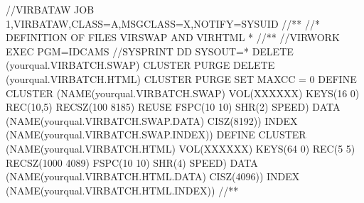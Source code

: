 \documentclass[letterpaper,10pt,english]{sphinxmanual}
\begin{document}
\begin{sphinxVerbatim}[commandchars=\\\{\}]
//VIRBATAW JOB 1,VIRBATAW,CLASS=A,MSGCLASS=X,NOTIFY=\PYGZam{}SYSUID
//*\PYGZhy{}\PYGZhy{}\PYGZhy{}\PYGZhy{}\PYGZhy{}\PYGZhy{}\PYGZhy{}\PYGZhy{}\PYGZhy{}\PYGZhy{}\PYGZhy{}\PYGZhy{}\PYGZhy{}\PYGZhy{}\PYGZhy{}\PYGZhy{}\PYGZhy{}\PYGZhy{}\PYGZhy{}\PYGZhy{}\PYGZhy{}\PYGZhy{}\PYGZhy{}\PYGZhy{}\PYGZhy{}\PYGZhy{}\PYGZhy{}\PYGZhy{}\PYGZhy{}\PYGZhy{}\PYGZhy{}\PYGZhy{}\PYGZhy{}\PYGZhy{}\PYGZhy{}\PYGZhy{}\PYGZhy{}\PYGZhy{}\PYGZhy{}\PYGZhy{}\PYGZhy{}\PYGZhy{}\PYGZhy{}\PYGZhy{}\PYGZhy{}\PYGZhy{}\PYGZhy{}\PYGZhy{}\PYGZhy{}\PYGZhy{}\PYGZhy{}\PYGZhy{}\PYGZhy{}\PYGZhy{}\PYGZhy{}\PYGZhy{}\PYGZhy{}\PYGZhy{}\PYGZhy{}\PYGZhy{}\PYGZhy{}\PYGZhy{}\PYGZhy{}\PYGZhy{}*
//* DEFINITION OF FILES VIRSWAP AND VIRHTML *
//*\PYGZhy{}\PYGZhy{}\PYGZhy{}\PYGZhy{}\PYGZhy{}\PYGZhy{}\PYGZhy{}\PYGZhy{}\PYGZhy{}\PYGZhy{}\PYGZhy{}\PYGZhy{}\PYGZhy{}\PYGZhy{}\PYGZhy{}\PYGZhy{}\PYGZhy{}\PYGZhy{}\PYGZhy{}\PYGZhy{}\PYGZhy{}\PYGZhy{}\PYGZhy{}\PYGZhy{}\PYGZhy{}\PYGZhy{}\PYGZhy{}\PYGZhy{}\PYGZhy{}\PYGZhy{}\PYGZhy{}\PYGZhy{}\PYGZhy{}\PYGZhy{}\PYGZhy{}\PYGZhy{}\PYGZhy{}\PYGZhy{}\PYGZhy{}\PYGZhy{}\PYGZhy{}\PYGZhy{}\PYGZhy{}\PYGZhy{}\PYGZhy{}\PYGZhy{}\PYGZhy{}\PYGZhy{}\PYGZhy{}\PYGZhy{}\PYGZhy{}\PYGZhy{}\PYGZhy{}\PYGZhy{}\PYGZhy{}\PYGZhy{}\PYGZhy{}\PYGZhy{}\PYGZhy{}\PYGZhy{}\PYGZhy{}\PYGZhy{}\PYGZhy{}\PYGZhy{}*
//VIRWORK EXEC PGM=IDCAMS
//SYSPRINT DD SYSOUT=*
    DELETE (yourqual.VIRBATCH.SWAP) CLUSTER PURGE
    DELETE (yourqual.VIRBATCH.HTML) CLUSTER PURGE
    SET MAXCC = 0
    DEFINE CLUSTER (NAME(yourqual.VIRBATCH.SWAP) \PYGZhy{}
        VOL(XXXXXX) KEYS(16 0) REC(10,5) RECSZ(100 8185) \PYGZhy{}
        REUSE FSPC(10 10) SHR(2) SPEED) \PYGZhy{}
    DATA (NAME(yourqual.VIRBATCH.SWAP.DATA) CISZ(8192)) \PYGZhy{}
    INDEX (NAME(yourqual.VIRBATCH.SWAP.INDEX))
    DEFINE CLUSTER (NAME(yourqual.VIRBATCH.HTML) \PYGZhy{}
        VOL(XXXXXX) KEYS(64 0) REC(5 5) RECSZ(1000 4089) \PYGZhy{}
        FSPC(10 10) SHR(4) SPEED) \PYGZhy{}
    DATA (NAME(yourqual.VIRBATCH.HTML.DATA) CISZ(4096)) \PYGZhy{}
    INDEX (NAME(yourqual.VIRBATCH.HTML.INDEX))
//*\PYGZhy{}\PYGZhy{}\PYGZhy{}\PYGZhy{}\PYGZhy{}\PYGZhy{}\PYGZhy{}\PYGZhy{}\PYGZhy{}\PYGZhy{}\PYGZhy{}\PYGZhy{}\PYGZhy{}\PYGZhy{}\PYGZhy{}\PYGZhy{}\PYGZhy{}\PYGZhy{}\PYGZhy{}\PYGZhy{}\PYGZhy{}\PYGZhy{}\PYGZhy{}\PYGZhy{}\PYGZhy{}\PYGZhy{}\PYGZhy{}\PYGZhy{}\PYGZhy{}\PYGZhy{}\PYGZhy{}\PYGZhy{}\PYGZhy{}\PYGZhy{}\PYGZhy{}\PYGZhy{}\PYGZhy{}\PYGZhy{}\PYGZhy{}\PYGZhy{}\PYGZhy{}\PYGZhy{}\PYGZhy{}\PYGZhy{}\PYGZhy{}\PYGZhy{}\PYGZhy{}\PYGZhy{}\PYGZhy{}\PYGZhy{}\PYGZhy{}\PYGZhy{}\PYGZhy{}\PYGZhy{}\PYGZhy{}\PYGZhy{}\PYGZhy{}\PYGZhy{}\PYGZhy{}\PYGZhy{}\PYGZhy{}\PYGZhy{}\PYGZhy{}\PYGZhy{}*

\end{sphinxVerbatim}
\end{document}
